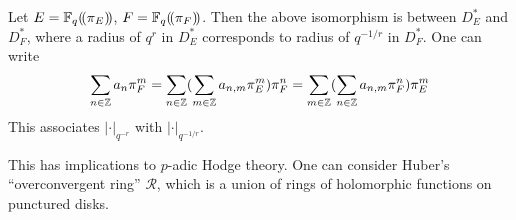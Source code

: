 \begin{example}
Let $E=\mathbb{F}_q(\!( {\pi_E} )\!)$, $F=\mathbb{F}_q(\!( {\pi_F} )\!)$. Then the above isomorphism is 
between $D_E^\ast$ and $D_F^\ast$, where a radius of $q^r$ in 
$D_E^\ast$ corresponds to radius of $q^{-1/r}$ in $D_F^\ast$. One can write 
\[
  \sum_{n\in \mathbb{Z}} a_n \pi_F^m = \sum_{n\in \mathbb{Z}} (\sum_{m\in \mathbb{Z}} a_{n,m} \pi_E^m) \pi_F^n = \sum_{m\in \mathbb{Z}} (\sum_{n\in \mathbb{Z}} a_{n,m} \pi_F^n) \pi_E^m 
\]
This associates $|\cdot |_{q^{-r}}$ with $|\cdot |_{q^{-1/r}}$. 
\end{example}

This has implications to $p$-adic Hodge theory. One can consider Huber's 
``overconvergent ring'' $\mathcal R$, which is a union of rings of holomorphic 
functions on punctured disks. 





